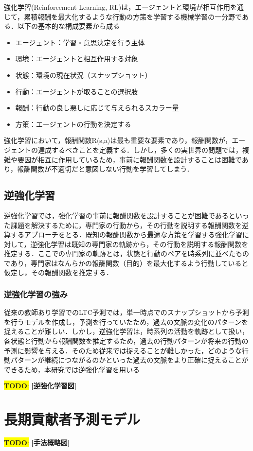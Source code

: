 \documentclass[submit,techrep,noauthor]{ipsj}
\newcommand{\todo}[1]{\colorbox{yellow}{{\bf TODO}:}{\color{red} {\textbf{[#1]}}}}
\begin{document}
強化学習(Reinforcement Learning, RL)は，エージェントと環境が相互作用を通じて，累積報酬を最大化するような行動の方策を学習する機械学習の一分野である．以下の基本的な構成要素から成る
\begin{itemize}
    \item エージェント：学習・意思決定を行う主体
    \item 環境：エージェントと相互作用する対象
    \item 状態：環境の現在状況（スナップショット）
    \item 行動：エージェントが取ることの選択肢
    \item 報酬：行動の良し悪しに応じて与えられるスカラー量
    \item 方策：エージェントの行動を決定する
\end{itemize}
強化学習において，報酬関数R(s,a)は最も重要な要素であり，報酬関数が，エージェントの達成するべきことを定義する．しかし，多くの実世界の問題では，複雑や要因が相互に作用しているため，事前に報酬関数を設計することは困難であり，報酬関数が不適切だと意図しない行動を学習してしまう．
\subsection{逆強化学習}
逆強化学習では，強化学習の事前に報酬関数を設計することが困難であるといった課題を解決するために，専門家の行動から，その行動を説明する報酬関数を逆算するアプローチをとる．既知の報酬関数から最適な方策を学習する強化学習に対して，逆強化学習は既知の専門家の軌跡から，その行動を説明する報酬関数を推定する．ここでの専門家の軌跡とは，状態と行動のペアを時系列に並べたものであり，専門家はなんらかの報酬関数（目的）を最大化するよう行動していると仮定し，その報酬関数を推定する．
\subsubsection{逆強化学習の強み}
従来の教師あり学習でのLTC予測では，単一時点でのスナップショットから予測を行うモデルを作成し，予測を行っていたため，過去の文脈の変化のパターンを捉えることが難しい．しかし，逆強化学習は，時系列の活動を軌跡として扱い，各状態と行動から報酬関数を推定するため，過去の行動パターンが将来の行動の予測に影響を与える．そのため従来では捉えることが難しかった，どのような行動パターンが継続につながるのかといった過去の文脈をより正確に捉えることができるため，本研究では逆強化学習を用いる

\todo{逆強化学習図}


\label{sec:format}
\section{長期貢献者予測モデル}
\label{config}
\todo{手法概略図}
\end{document}
